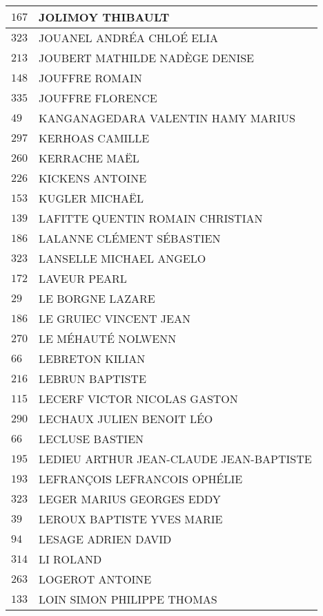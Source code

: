 \begin{xltabular}{\linewidth}{|l|X|}
    $167$ & JOLIMOY THIBAULT \\
    \hline
    $323$ & JOUANEL ANDRÉA CHLOÉ ELIA \\
    \hline
    $213$ & JOUBERT MATHILDE NADÈGE DENISE \\
    \hline
    $148$ & JOUFFRE ROMAIN \\
    \hline
    $335$ & JOUFFRE FLORENCE \\
    \hline
    $49$ & KANGANAGEDARA VALENTIN HAMY MARIUS \\
    \hline
    $297$ & KERHOAS CAMILLE \\
    \hline
    $260$ & KERRACHE MAËL \\
    \hline
    $226$ & KICKENS ANTOINE \\
    \hline
    $153$ & KUGLER MICHAËL \\
    \hline
    $139$ & LAFITTE QUENTIN ROMAIN CHRISTIAN \\
    \hline
    $186$ & LALANNE CLÉMENT SÉBASTIEN \\
    \hline
    $323$ & LANSELLE MICHAEL ANGELO \\
    \hline
    $172$ & LAVEUR PEARL \\
    \hline
    $29$ & LE BORGNE LAZARE \\
    \hline
    $186$ & LE GRUIEC VINCENT JEAN \\
    \hline
    $270$ & LE MÉHAUTÉ NOLWENN \\
    \hline
    $66$ & LEBRETON KILIAN \\
    \hline
    $216$ & LEBRUN BAPTISTE \\
    \hline
    $115$ & LECERF VICTOR NICOLAS GASTON \\
    \hline
    $290$ & LECHAUX JULIEN BENOIT LÉO \\
    \hline
    $66$ & LECLUSE BASTIEN \\
    \hline
    $195$ & LEDIEU ARTHUR JEAN-CLAUDE JEAN-BAPTISTE \\
    \hline
    $193$ & LEFRANÇOIS LEFRANCOIS OPHÉLIE \\
    \hline
    $323$ & LEGER MARIUS GEORGES EDDY \\
    \hline
    $39$ & LEROUX BAPTISTE YVES MARIE \\
    \hline
    $94$ & LESAGE ADRIEN DAVID \\
    \hline
    $314$ & LI ROLAND \\
    \hline
    $263$ & LOGEROT ANTOINE \\
    \hline
    $133$ & LOIN SIMON PHILIPPE THOMAS \\

\end{xltabular}

